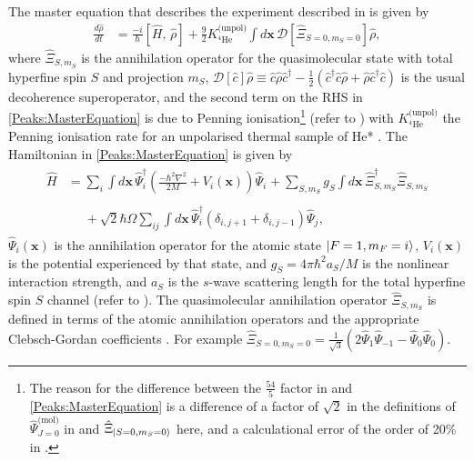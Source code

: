 The master equation that describes the experiment described in  is given by
\begin{align}
    \label{Peaks:MasterEquation}
    \frac{d \hat{\rho}}{d t} &= \frac{-i}{\hbar} [\hat{H},\, \hat{\rho} ] + \frac{9}{2} K^\text{(unpol)}_{^{4}\text{He}} \int d \bm{x}\, \mathcal{D}\left[\hat{\Xi}_{S=0,m_S=0} \right] \hat{\rho},
\end{align}
where $\displaystyle\hat{\Xi}_{S, m_S}$ is the annihilation operator for the quasimolecular state with total hyperfine spin $S$ and projection $m_S$, $\mathcal{D}[\hat{c}]\hat{\rho} \equiv \hat{c}\hat{\rho}\hat{c}^\dagger - \frac{1}{2}(\hat{c}^\dagger \hat{c} \hat{\rho} + \hat{\rho} \hat{c}^\dagger \hat{c})$ is the usual decoherence superoperator, and the second term on the RHS in \eqref{Peaks:MasterEquation} is due to Penning ionisation\footnote{The reason for the difference between the $\displaystyle \frac{54}{5}$ factor in \citet{Dall:2009} and \eqref{Peaks:MasterEquation} is a difference of a factor of $\sqrt{2}$ in the definitions of $\hat{\Psi}_{J=0}^{\text{(mol)}}$ in \citep{Dall:2009} and $\displaystyle\hat{\Xi}_{\left|S=0, m_S=0\right>}$ here, and a calculational error of the order of 20\% in \citep{Dall:2009}.} (refer to ) with $K^\text{(unpol)}_{^{4}\text{He}}$ the Penning ionisation rate for an unpolarised thermal sample of He* \citep{Stas:2006kx}. The Hamiltonian in \eqref{Peaks:MasterEquation} is given by
\begin{align}
    \label{Peaks:3DHamiltonian}
    \begin{split}
    \hat{H} &= \sum_i \int d\bm{x}\, \hat{\Psi}_i^\dagger \left(\frac{-\hbar^2 \nabla^2}{2 M} + V_i(\bm{x})\right)\hat{\Psi}_i^{\phantom{\dagger}} + \sum_{S, m_S} g_{S}\int d\bm{x}\, \hat{\Xi}_{S, m_S}^\dagger \hat{\Xi}_{S, m_S}^{\phantom{\dagger}}\\
    \\
            &\phantom{=} + \sqrt{2} \hbar \Omega \sum_{i j}\int d\bm{x}\, \hat{\Psi}_i^\dagger \left(\delta_{i, j+1} + \delta_{i, j-1}\right) \hat{\Psi}_j^{\phantom{\dagger}},
    \end{split}
\end{align}
$\displaystyle \hat{\Psi}_i(\bm{x})$ is the annihilation operator for the atomic state $\displaystyle {\ensuremath{\left|F=1, m_F=i\right>}}$, $V_i(\bm{x})$ is the potential experienced by that state, and $g_S = 4 \pi \hbar^2 a_S/M$ is the nonlinear interaction strength, and $a_S$ is the $s$-wave scattering length for the total hyperfine spin $S$ channel (refer to ). The quasimolecular annihilation operator $\displaystyle \hat{\Xi}_{S, m_S}$ is defined in terms of the atomic annihilation operators and the appropriate Clebsch-Gordan coefficients \citep{Ho:1998}. For example $\displaystyle \hat{\Xi}_{S=0, m_S=0} = \frac{1}{\sqrt{3}} \left( 2 \hat{\Psi}_1 \hat{\Psi}_{-1} - \hat{\Psi}_0 \hat{\Psi}_0\right)$.

